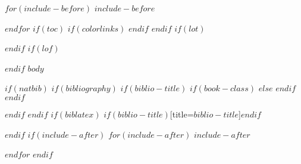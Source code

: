 \documentclass[$if(fontsize)$$fontsize$,$endif$$if(lang)$$babel-lang$,$endif$$if(papersize)$$papersize$paper,$endif$$for(classoption)$$classoption$$sep$,$endfor$]{$documentclass$}
\begin{document}
$for(include-before)$
$include-before$

$endfor$
$if(toc)$
{
$if(colorlinks)$
\hypersetup{linkcolor=$if(toccolor)$$toccolor$$else$black$endif$}
$endif$
\setcounter{tocdepth}{$toc-depth$}
\newpage
{}
\tableofcontents
}
$endif$
$if(lot)$
\listoftables
$endif$
$if(lof)$
\listoffigures
$endif$
$body$

$if(natbib)$
$if(bibliography)$
$if(biblio-title)$
$if(book-class)$
\renewcommand\bibname{$biblio-title$}
$else$
\renewcommand\refname{$biblio-title$}
$endif$
$endif$


$endif$
$endif$
$if(biblatex)$
\printbibliography$if(biblio-title)$[title=$biblio-title$]$endif$

$endif$
$if(include-after)$
\appendix
$for(include-after)$
$include-after$

$endfor$
$endif$
\end{document}
